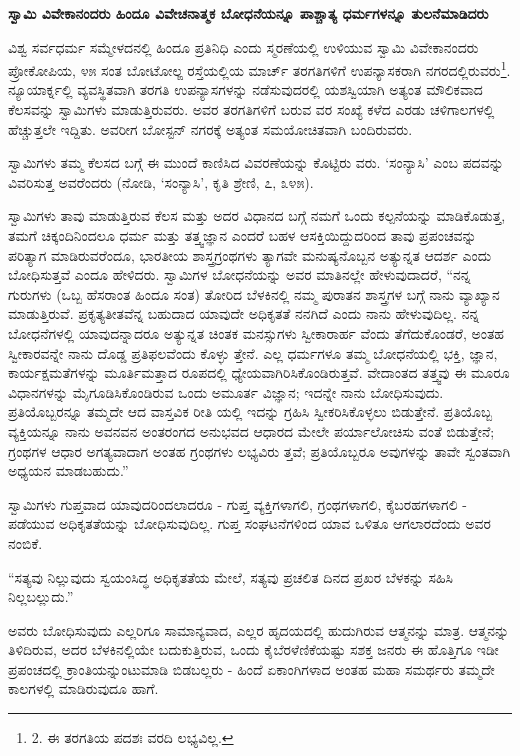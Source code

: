 \begin{center}
\textbf{ಸ್ವಾಮಿ ವಿವೇಕಾನಂದರು ಹಿಂದೂ ವಿವೇಚನಾತ್ಮಕ ಬೋಧನೆಯನ್ನೂ ಪಾಶ್ಚಾತ್ಯ ಧರ್ಮಗಳನ್ನೂ ತುಲನೆಮಾಡಿದರು}
\end{center}

ವಿಶ್ವ ಸರ್ವಧರ್ಮ ಸಮ್ಮೇಳದನಲ್ಲಿ ಹಿಂದೂ ಪ್ರತಿನಿಧಿ ಎಂದು ಸ್ಮರಣೆಯಲ್ಲಿ ಉಳಿಯುವ ಸ್ವಾಮಿ ವಿವೇಕಾನಂದರು ಪ್ರೋಕೋಪಿಯ, ೪೫ ಸಂತ ಬೋಟೋಲ್ಙ ರಸ್ತೆಯಲ್ಲಿಯ ಮಾರ್ಚ್ ತರಗತಿಗಳಿಗೆ ಉಪನ್ಯಾಸಕರಾಗಿ ನಗರದಲ್ಲಿರುವರು\footnote{2. ಈ ತರಗತಿಯ ಪದಶಃ ವರದಿ ಲಭ್ಯವಿಲ್ಲ.}. ನ್ಯೂಯಾರ್ಕ್ನಲ್ಲಿ ವ್ಯವಸ್ಥಿತವಾಗಿ ತರಗತಿ ಉಪನ್ಯಾಸಗಳನ್ನು ನಡೆಸುವುದರಲ್ಲಿ ಯಶಸ್ವಿಯಾಗಿ ಅತ್ಯಂತ ಮೌಲಿಕವಾದ ಕೆಲಸವನ್ನು ಸ್ವಾಮಿಗಳು ಮಾಡುತ್ತಿರುವರು. ಅವರ ತರಗತಿಗಳಿಗೆ ಬರುವ ವರ ಸಂಖ್ಯೆ ಕಳೆದ ಎರಡು ಚಳಿಗಾಲಗಳಲ್ಲಿ ಹೆಚ್ಚುತ್ತಲೇ ಇದ್ದಿತು. ಅವರೀಗ ಬೋಸ್ಟನ್ ನಗರಕ್ಕೆ ಅತ್ಯಂತ ಸಮಯೋಚಿತವಾಗಿ ಬಂದಿರುವರು.

ಸ್ವಾಮಿಗಳು ತಮ್ಮ ಕೆಲಸದ ಬಗ್ಗೆ ಈ ಮುಂದೆ ಕಾಣಿಸಿದ ವಿವರಣೆಯನ್ನು ಕೊಟ್ಟಿರು ವರು. ‘ಸಂನ್ಯಾಸಿ’ ಎಂಬ ಪದವನ್ನು ವಿವರಿಸುತ್ತ ಅವರೆಂದರು (ನೋಡಿ, ‘ಸಂನ್ಯಾಸಿ’, ಕೃತಿ ಶ್ರೇಣಿ, ೭, ೩೪೫).

ಸ್ವಾಮಿಗಳು ತಾವು ಮಾಡುತ್ತಿರುವ ಕೆಲಸ ಮತ್ತು ಅದರ ವಿಧಾನದ ಬಗ್ಗೆ ನಮಗೆ ಒಂದು ಕಲ್ಪನೆಯನ್ನು ಮಾಡಿಕೊಡುತ್ತ, ತಮಗೆ ಚಿಕ್ಕಂದಿನಿಂದಲೂ ಧರ್ಮ ಮತ್ತು ತತ್ತ್ವಜ್ಞಾನ ಎಂದರೆ ಬಹಳ ಆಸಕ್ತಿಯಿದ್ದುದರಿಂದ ತಾವು ಪ್ರಪಂಚವನ್ನು ಪರಿತ್ಯಾಗ ಮಾಡಿರುವರೆಂದೂ, ಭಾರತೀಯ ಶಾಸ್ತ್ರಗ್ರಂಥಗಳು ತ್ಯಾಗವೇ ಮನುಷ್ಯನೊಬ್ಬನ ಅತ್ಯುನ್ನತ ಆದರ್ಶ ಎಂದು ಬೋಧಿಸುತ್ತವೆ ಎಂದೂ ಹೇಳಿದರು. ಸ್ವಾಮಿಗಳ ಬೋಧನೆಯನ್ನು ಅವರ ಮಾತಿನಲ್ಲೇ ಹೇಳುವುದಾದರೆ, “ನನ್ನ ಗುರುಗಳು (ಒಬ್ಬ ಹೆಸರಾಂತ ಹಿಂದೂ ಸಂತ) ತೋರಿದ ಬೆಳಕಿನಲ್ಲಿ ನಮ್ಮ ಪುರಾತನ ಶಾಸ್ತ್ರಗಳ ಬಗ್ಗೆ ನಾನು ವ್ಯಾಖ್ಯಾನ ಮಾಡುತ್ತಿರುವೆ. ಪ್ರಕೃತ್ಯತೀತವೆನ್ನ ಬಹುದಾದ ಯಾವುದೇ ಅಧಿಕೃತತೆ ನನಗಿದೆ ಎಂದು ನಾನು ಹೇಳುವುದಿಲ್ಲ. ನನ್ನ ಬೋಧನೆಗಳಲ್ಲಿ ಯಾವುದನ್ನಾದರೂ ಅತ್ಯುನ್ನತ ಚಿಂತಕ ಮನಸ್ಸುಗಳು ಸ್ವೀಕಾರಾರ್ಹ ವೆಂದು ತೆಗೆದುಕೊಂಡರೆ, ಅಂತಹ ಸ್ವೀಕಾರವನ್ನೇ ನಾನು ದೊಡ್ಡ ಪ್ರತಿಫಲವೆಂದು ಕೊಳ್ಳು ತ್ತೇನೆ. ಎಲ್ಲ ಧರ್ಮಗಳೂ ತಮ್ಮ ಬೋಧನೆಯಲ್ಲಿ ಭಕ್ತಿ, ಜ್ಞಾನ, ಕಾರ್ಯಕ್ಷಮತೆಗಳನ್ನು ಮೂರ್ತಿಮತ್ತಾದ ರೂಪದಲ್ಲಿ ಧ್ಯೇಯವಾಗಿರಿಸಿಕೊಂಡಿರುತ್ತವೆ. ವೇದಾಂತದ ತತ್ತ್ವವು ಈ ಮೂರೂ ವಿಧಾನಗಳನ್ನು ಮೈಗೂಡಿಸಿಕೊಂಡಿರುವ ಒಂದು ಅಮೂರ್ತ ವಿಜ್ಞಾನ; ಇದನ್ನೇ ನಾನು ಬೋಧಿಸುವುದು. ಪ್ರತಿಯೊಬ್ಬರನ್ನೂ ತಮ್ಮದೇ ಆದ ವಾಸ್ತವಿಕ ರೀತಿ ಯಲ್ಲಿ ಇದನ್ನು ಗ್ರಹಿಸಿ ಸ್ವೀಕರಿಸಿಕೊಳ್ಳಲು ಬಿಡುತ್ತೇನೆ. ಪ್ರತಿಯೊಬ್ಬ ವ್ಯಕ್ತಿಯನ್ನೂ ನಾನು ಅವನವನ ಅಂತರಂಗದ ಅನುಭವದ ಆಧಾರದ ಮೇಲೇ ಪರ್ಯಾಲೋಚಿಸು ವಂತೆ ಬಿಡುತ್ತೇನೆ; ಗ್ರಂಥಗಳ ಆಧಾರ ಅಗತ್ಯವಾದಾಗ ಅಂತಹ ಗ್ರಂಥಗಳು ಲಭ್ಯವಿರು ತ್ತವೆ; ಪ್ರತಿಯೊಬ್ಬರೂ ಅವುಗಳನ್ನು ತಾವೇ ಸ್ವಂತವಾಗಿ ಅಧ್ಯಯನ ಮಾಡಬಹುದು.”

ಸ್ವಾಮಿಗಳು ಗುಪ್ತವಾದ ಯಾವುದರಿಂದಲಾದರೂ - ಗುಪ್ತ ವ್ಯಕ್ತಿಗಳಾಗಲಿ, ಗ್ರಂಥಗಳಾಗಲಿ, ಕೈಬರಹಗಳಾಗಲಿ - ಪಡೆಯುವ ಅಧಿಕೃತತೆಯನ್ನು ಬೋಧಿಸುವುದಿಲ್ಲ. ಗುಪ್ತ ಸಂಘಟನೆಗಳಿಂದ ಯಾವ ಒಳಿತೂ ಆಗಲಾರದೆಂದು ಅವರ ನಂಬಿಕೆ.

“ಸತ್ಯವು ನಿಲ್ಲುವುದು ಸ್ವಯಂಸಿದ್ಧ ಅಧಿಕೃತತೆಯ ಮೇಲೆ, ಸತ್ಯವು ಪ್ರಚಲಿತ ದಿನದ ಪ್ರಖರ ಬೆಳಕನ್ನು ಸಹಿಸಿ ನಿಲ್ಲಬಲ್ಲುದು.”

ಅವರು ಬೋಧಿಸುವುದು ಎಲ್ಲರಿಗೂ ಸಾಮಾನ್ಯವಾದ, ಎಲ್ಲರ ಹೃದಯದಲ್ಲಿ ಹುದುಗಿರುವ ಆತ್ಮನನ್ನು ಮಾತ್ರ. ಆತ್ಮನನ್ನು ತಿಳಿದಿರುವ, ಅದರ ಬೆಳಕಿನಲ್ಲಿಯೇ ಬದುಕುತ್ತಿರುವ, ಒಂದು ಕೈಬೆರಳೆಣಿಕೆಯಷ್ಟು ಸಶಕ್ತ ಜನರು ಈ ಹೊತ್ತಿಗೂ ಇಡೀ ಪ್ರಪಂಚದಲ್ಲಿ ಕ್ರಾಂತಿಯನ್ನುಂಟುಮಾಡಿ ಬಿಡಬಲ್ಲರು - ಹಿಂದೆ ಏಕಾಂಗಿಗಳಾದ ಅಂತಹ ಮಹಾ ಸಮರ್ಥರು ತಮ್ಮದೇ ಕಾಲಗಳಲ್ಲಿ ಮಾಡಿರುವುದೂ ಹಾಗೆ.

